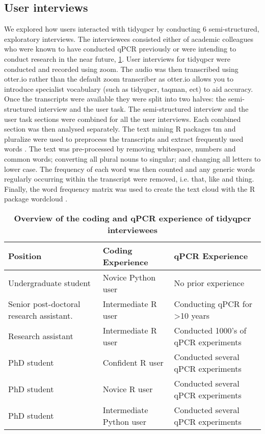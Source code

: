 \documentclass[../main.tex]{subfiles}
\begin{document}
\subsection{User interviews}
We explored how users interacted with tidyqpcr by conducting 6 semi-structured, exploratory interviews. 
The interviewees consisted either of academic colleagues who were known to have conducted qPCR previously or were intending to conduct research in the near future, \ref{tab:interviewee-table}.
User interviews for tidyqpcr were conducted and recorded using zoom.
The audio was then transcribed using otter.io rather than the default zoom transcriber as otter.io allows you to introduce specialist vocabulary (such as tidyqpcr, taqman, ect) to aid accuracy.
Once the transcripts were available they were split into two halves: the semi-structured interview and the user task.
The semi-structured interview and the user task sections were combined for all the user interviews.
Each combined section was then analysed separately. 
The text mining R packages tm and pluralize were used to preprocess the transcripts and extract frequently used words \parencite{Feinerer2008, Rudis2020}.
The text was pre-processed by removing whitespace, numbers and common words; converting all plural nouns to singular; and changing all letters to lower case.
The frequency of each word was then counted and any generic words regularly occurring within the transcript were removed, i.e. that, like and thing.
Finally, the word frequency matrix was used to create the text cloud with the R package wordcloud \parencite{Fellows2018}.

\begin{table}
\centering
\begingroup
\setlength{\tabcolsep}{5pt}
\def\arraystretch{1.25}
\begin{tabular}{|| m{4cm} | m{4.3cm} | m{4cm} ||}
 \hline
 \textbf{\large Position} & \textbf{\large Coding Experience} & \textbf{\large qPCR Experience} \\ [0.5ex] 
 \hline
 Undergraduate student & Novice Python user & No prior experience\\ 
 \hline
 Senior post-doctoral research assistant. & Intermediate R user & Conducting qPCR for >10 years \\
 \hline
 Research assistant & Intermediate R user & Conducted 1000's of qPCR experiments\\
 \hline
 PhD student & Confident R user & Conducted several qPCR experiments \\
 \hline
 PhD student & Novice R user & Conducted several qPCR experiments\\
 \hline
 PhD student & Intermediate Python user & Conducted several qPCR experiments\\
 \hline
\end{tabular}
 \endgroup
 \caption[Overview of the coding and qPCR experience of tidyqpcr interviewees]{\textbf{Overview of the coding and qPCR experience of tidyqpcr interviewees}}
 \label{tab:interviewee-table}
\end{table}
\end{document}
